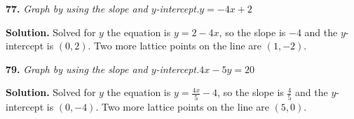 \documentclass{ximera}
\begin{document}
\begin{problem}
\textbf{77.} \emph{Graph by using the slope and $y$-intercept.}\quad $y = -4x + 2$         \figbox{\gridsm}

\begin{hint}
\textbf{Solution.} Solved for $y$ the equation is $y=2 - 4x$, so the slope is $-4$ and the $y$-intercept is $(0,2)$. Two more lattice points on the line are $(1,-2)$.
\end{hint}
\end{problem}

\begin{problem}
\textbf{79.} \emph{Graph by using the slope and $y$-intercept.}\quad $4x - 5y = 20$        \figbox{\gridsm}

\begin{hint}
\textbf{Solution.} Solved for $y$ the equation is $y=\frac{4x}{5} - 4$, so the slope is $\frac{4}{5}$ and the $y$-intercept is $(0,-4)$. Two more lattice points on the line are $(5,0)$.
\end{hint}
\end{problem}
\end{document}
